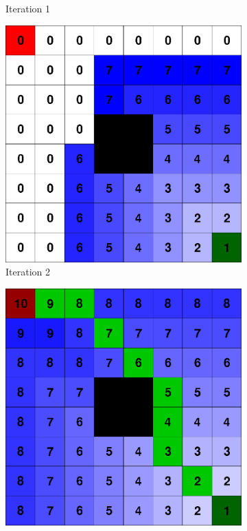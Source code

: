 \begin{figure}[]
\begin{subfigure}[b]{0.2\linewidth}
     \caption{Iteration 1}
  \end{subfigure}
  \hfill
  \begin{subfigure}[b]{0.2\linewidth}
    \includegraphics[width=\linewidth]{images/wave_front_planner_2.png}
    \caption{Iteration 2}
  \end{subfigure}
  \hfill
  \begin{subfigure}[b]{0.2\linewidth}
    \includegraphics[width=\linewidth]{images/wave_front_planner_3.png}

\end{subfigure}
\end{figure}
